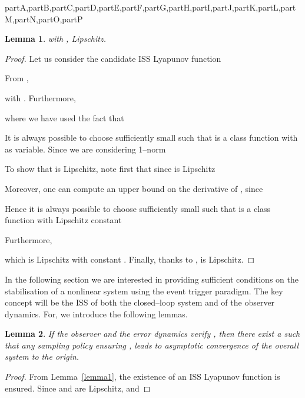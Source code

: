 \documentclass[letterpaper, 10 pt, conference]{ieeeconf}
\def\compile{partA,partB,partC,partD,partE,partF,partG,partH,partI,partJ,partK,partL,partM,partN,partO,partP}
\newenvironment{partF}[1][]{}{}
\newenvironment{partG}[1][]{}{}  \newenvironment{partH}[1][]{}{}
\newenvironment{partI}[1][]{}{}  \newenvironment{partJ}[1][]{}{}
\newtheorem{lemma}{Lemma}
\begin{document}
\begin{xcomment}{\compile}
\begin{partF}
\begin{lemma}
with ,  Lipschitz.
\end{lemma}

\end{partF}
\begin{partG} 

\medskip
\begin{proof}
Let us consider the candidate ISS Lyapunov function 

From , 

with . Furthermore,

where we have used the fact that

It is always possible to choose  sufficiently small such that  is a class  function with  as variable. Since we are considering 1--norm

To show that  is Lipschitz, note first that since  is Lipschitz

Moreover, one can compute an upper bound on the derivative of , since 

Hence it is always possible to choose  sufficiently small such that  is a class  function with Lipschitz constant 

Furthermore,
 
which is Lipschitz with constant . Finally, thanks to ,  is Lipschitz.
\end{proof}

\end{partG}
\begin{partH}



\medskip
In the following section we are interested in providing sufficient conditions on the stabilisation of a nonlinear system using the event trigger paradigm. The key concept will be the ISS of both the closed--loop system and of the observer dynamics. For, we introduce the following lemmas.


\medskip
\begin{lemma}\label{lemma2}
If the observer and the error dynamics verify , then there exist a  such that any sampling policy ensuring , leads to asymptotic convergence of the overall system to the origin.
\end{lemma}

\end{partH}
\begin{partI} 

\medskip
\begin{proof} From Lemma~\ref{lemma1}, the existence of an ISS Lyapunov function  is ensured. Since  and  are Lipschitz, 
and 


\end{proof}
\end{partI}
\end{xcomment}
\end{document}

